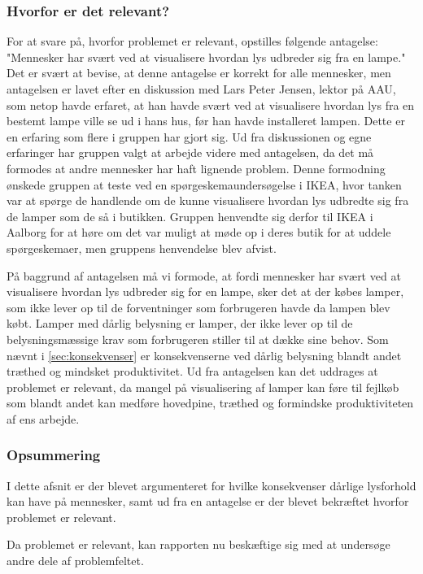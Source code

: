 \subsubsection{Hvorfor er det relevant?}
\label{sec:hvorfor_relavant}
For at svare på, hvorfor problemet er relevant, opstilles følgende antagelse: "Mennesker har svært ved at visualisere hvordan lys udbreder sig fra en lampe." Det er svært at bevise, at denne antagelse er korrekt for alle mennesker, men antagelsen er lavet efter en diskussion med Lars Peter Jensen, lektor på AAU, som netop havde erfaret, at han havde svært ved at visualisere hvordan lys fra en bestemt lampe ville se ud i hans hus, før han havde installeret lampen. Dette er en erfaring som flere i gruppen har gjort sig. Ud fra diskussionen og egne erfaringer har gruppen valgt at arbejde videre med antagelsen, da det må formodes at andre mennesker har haft lignende problem. Denne formodning ønskede gruppen at teste ved en spørgeskemaundersøgelse i IKEA, hvor tanken var at spørge de handlende om de kunne visualisere hvordan lys udbredte sig fra de lamper som de så i butikken. Gruppen henvendte sig derfor til IKEA i Aalborg for at høre om det var muligt at møde op i deres butik for at uddele spørgeskemaer, men gruppens henvendelse blev afvist.

På baggrund af antagelsen må vi formode, at fordi mennesker har svært ved at visualisere hvordan lys udbreder sig for en lampe, sker det at der købes lamper, som ikke lever op til de forventninger som forbrugeren havde da lampen blev købt. Lamper med dårlig belysning er lamper, der ikke lever op til de belysningsmæssige krav som forbrugeren stiller til at dække sine behov. Som nævnt i \ref{sec:konsekvenser} er konsekvenserne ved dårlig belysning blandt andet træthed og mindsket produktivitet.
Ud fra antagelsen kan det uddrages at problemet er relevant, da mangel på visualisering af lamper kan føre til fejlkøb som blandt andet kan medføre hovedpine, træthed og formindske produktiviteten af ens arbejde.

\subsubsection*{Opsummering}
I dette afsnit er der blevet argumenteret for hvilke konsekvenser dårlige lysforhold kan have på mennesker, samt ud fra en antagelse er der blevet bekræftet hvorfor problemet er relevant. 

Da problemet er relevant, kan rapporten nu beskæftige sig med at undersøge andre dele af problemfeltet. 

